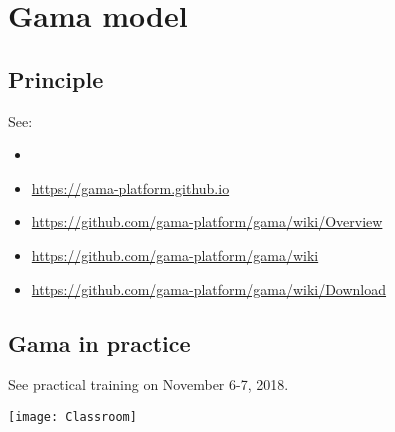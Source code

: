 \chapter{Gama model}

\section{Principle}

See:
\begin{itemize}
	\item \citet{Grignard2013}
	\item \url{https://gama-platform.github.io}
	\item \url{https://github.com/gama-platform/gama/wiki/Overview}
	\item \url{https://github.com/gama-platform/gama/wiki}
	\item \url{https://github.com/gama-platform/gama/wiki/Download}
\end{itemize}


\section{Gama in practice}

See practical training on November 6-7, 2018.
\bigskip

\texttt{[image: Classroom]}

